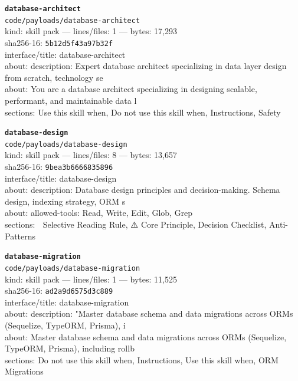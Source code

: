 \noindent\textbf{\texttt{database-architect}}\\
\texttt{code/payloads/database-architect}\\
kind: skill pack --- lines/files: 1 --- bytes: 17,293\\
sha256-16: \texttt{5b12d5f43a97b32f}\\
interface/title: database-architect\\
about: description: Expert database architect specializing in data layer design from scratch, technology se\\
about: You are a database architect specializing in designing scalable, performant, and maintainable data l\\
sections: Use this skill when, Do not use this skill when, Instructions, Safety\\
\vspace*{6.0pt}

\noindent\textbf{\texttt{database-design}}\\
\texttt{code/payloads/database-design}\\
kind: skill pack --- lines/files: 8 --- bytes: 13,657\\
sha256-16: \texttt{9bea3b6666835896}\\
interface/title: database-design\\
about: description: Database design principles and decision-making. Schema design, indexing strategy, ORM s\\
about: allowed-tools: Read, Write, Edit, Glob, Grep\\
sections: 🎯 Selective Reading Rule, ⚠️ Core Principle, Decision Checklist, Anti-Patterns\\
\vspace*{6.0pt}

\noindent\textbf{\texttt{database-migration}}\\
\texttt{code/payloads/database-migration}\\
kind: skill pack --- lines/files: 1 --- bytes: 11,525\\
sha256-16: \texttt{ad2a9d6575d3c889}\\
interface/title: database-migration\\
about: description: "Master database schema and data migrations across ORMs (Sequelize, TypeORM, Prisma), i\\
about: Master database schema and data migrations across ORMs (Sequelize, TypeORM, Prisma), including rollb\\
sections: Do not use this skill when, Instructions, Use this skill when, ORM Migrations\\
\vspace*{6.0pt}

